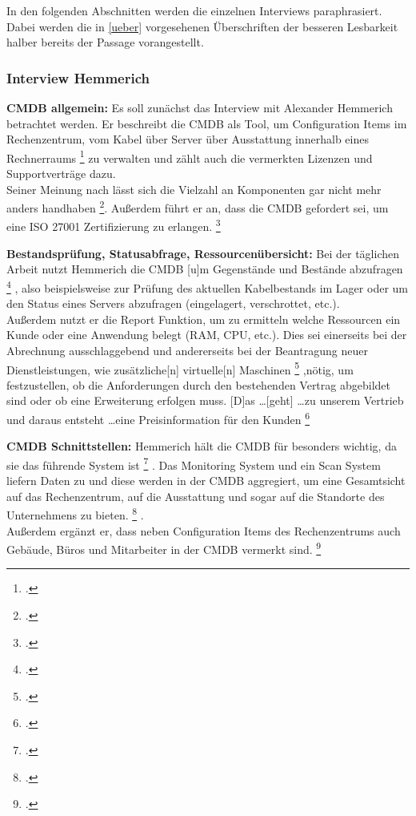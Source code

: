 In den folgenden Abschnitten werden die einzelnen Interviews paraphrasiert. Dabei werden die in \autoref{ueber} vorgesehenen Überschriften der besseren Lesbarkeit halber bereits der Passage vorangestellt.

\subsubsection{Interview Hemmerich}
\textbf{\acs{CMDB} allgemein: }Es soll zunächst das Interview mit Alexander Hemmerich betrachtet werden. Er beschreibt die \acs{CMDB} als Tool, um \glqq{}Configuration Items im Rechenzentrum, vom Kabel über Server über Ausstattung innerhalb eines Rechnerraums\grqq
\footcite[][o. \pno]{Hemm_2019}
zu verwalten und zählt auch die vermerkten Lizenzen und Supportverträge dazu.\\
Seiner Meinung nach lässt sich die Vielzahl an Komponenten \glqq{}gar nicht mehr anders handhaben\grqq
\footcite[][o. \pno]{Hemm_2019}.
Außerdem führt er an, dass die \acs{CMDB} gefordert sei, um eine ISO 27001 Zertifizierung zu erlangen.
\footcite[Vgl.][o. \pno]{Hemm_2019}

\textbf{Bestandsprüfung, Statusabfrage, Ressourcenübersicht: }Bei der täglichen Arbeit nutzt Hemmerich die \acs{CMDB} \glqq{}[u]m Gegenstände und Bestände abzufragen\grqq
\footcite[][o. \pno]{Hemm_2019}
, also beispielsweise zur Prüfung des aktuellen Kabelbestands im Lager oder um den Status eines Servers abzufragen (eingelagert, verschrottet, etc.).\\
Außerdem nutzt er die Report Funktion, um zu ermitteln welche Ressourcen ein Kunde oder eine Anwendung belegt (RAM, CPU, etc.). Dies sei einerseits bei der Abrechnung ausschlaggebend und andererseits bei der Beantragung neuer Dienstleistungen, wie \glqq{}zusätzliche[n] virtuelle[n] Maschinen\grqq
\footcite[][o. \pno]{Hemm_2019}
,nötig, um festzustellen, ob die Anforderungen durch den bestehenden Vertrag abgebildet sind oder ob eine Erweiterung erfolgen muss. \glqq{}[D]as \ldots [geht] \ldots zu unserem Vertrieb und daraus entsteht \ldots eine Preisinformation für den Kunden\grqq
\footcites[][o. \pno]{Hemm_2019}[Vgl.][o. \pno]{Hemm_2019}

\textbf{\acs{CMDB} Schnittstellen: }Hemmerich hält die \acs{CMDB} für besonders wichtig, da sie \glqq{}das führende System ist\grqq
\footcite[][o. \pno]{Hemm_2019}
. Das Monitoring System und ein Scan System liefern Daten zu und diese werden in der CMDB \glqq{}aggregiert, um eine Gesamtsicht auf das Rechenzentrum, auf die Ausstattung und sogar auf die Standorte des Unternehmens zu bieten.\grqq
\footcite[][o. \pno]{Hemm_2019}
.\\
Außerdem ergänzt er, dass neben Configuration Items des Rechenzentrums auch Gebäude, Büros und Mitarbeiter in der \acs{CMDB} vermerkt sind.
\footcite[Vgl.][o. \pno]{Hemm_2019}

